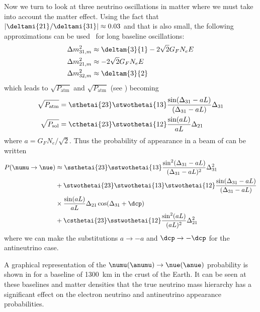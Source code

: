 Now we turn to look at three neutrino oscillations in matter where we must take into account the matter effect.
Using the fact that $|\deltami{21}/\deltami{31}| \approx 0.03$ and that  is also small, the following approximations can be used~\cite{Nunokawa_2008} for long baseline oscillations:
\begin{align}
  \Delta m^{2}_{31, m} &\approx \deltam{3}{1} - 2 \sqrt{2} G_{F} N_{e} E \\
  \Delta m^{2}_{21, m} &\approx - 2 \sqrt{2} G_{F} N_{e} E \\
  \Delta m^{2}_{32, m} &\approx \deltam{3}{2}
\end{align}
which leads to $\sqrt{P_{\text{atm}}}$ and $\sqrt{P_{\text{atm}}}$ (see ) becoming~\cite{Nunokawa_2008}
\begin{align}
  \sqrt{P_{\text{atm}}} &= \sthetai{23} \stwothetai{13} \frac{ \sin(\Delta_{31}-aL) }{ (\Delta_{31} - aL) } \Delta_{31} \\
  \sqrt{P_{\text{sol}}} &= \cthetai{23} \stwothetai{12} \frac{ \sin(aL) }{ aL } \Delta_{21}
\end{align}
where $a = G_{F}N_{e} / \sqrt{2}$.
Thus the probability of \nue appearance in a beam of \numu can be written
\begin{align}
  P(\numu \rightarrow \nue) &\approx \ssthetai{23} \sstwothetai{13} \frac{ \sin^{2}(\Delta_{31}-aL) }{ (\Delta_{31} - aL)^{2} } \Delta_{31}^{2} \\
  &+ \stwothetai{23} \stwothetai{13} \stwothetai{12} \frac{ \sin(\Delta_{31}-aL) }{ (\Delta_{31} - aL) } \\
  & \times \frac{ \sin(aL) }{aL} \Delta_{21} \cos(\Delta_{31} + \dcp) \\
  &+ \csthetai{23}\sstwothetai{12} \frac{ \sin^{2}(aL) }{(aL)^{2}} \Delta_{21}^{2} 
\end{align}
where we can make the substitutions $a \rightarrow -a$ and $\dcp \rightarrow -\dcp$ for the antineutrino case.

A graphical representation of the $\numu(\anumu) \rightarrow \nue(\anue)$ probability is shown in  for a baseline of 1300~km in the crust of the Earth.
It can be seen at these baselines and matter densities that the true neutrino mass hierarchy has a significant effect on the electron neutrino and antineutrino appearance probabilities.

